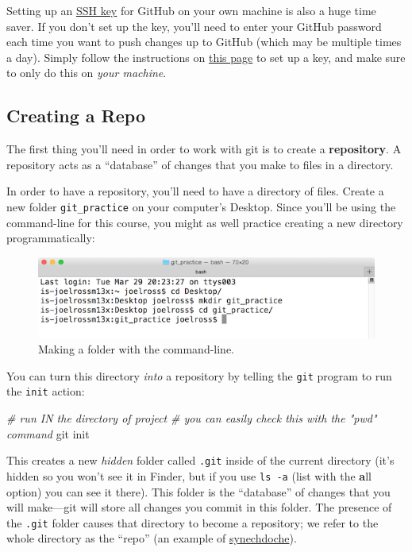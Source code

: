 \documentclass[]{book}
\newenvironment{Shaded}{\begin{snugshade}}{\end{snugshade}}
\newcommand{\CommentTok}[1]{\textcolor[rgb]{0.56,0.35,0.01}{\textit{#1}}}
\newcommand{\FunctionTok}[1]{\textcolor[rgb]{0.00,0.00,0.00}{#1}}
\newcommand{\NormalTok}[1]{#1}
\theoremstyle{definition}
\theoremstyle{definition}
\theoremstyle{remark}
\begin{document}
Setting up an
\href{https://help.github.com/articles/generating-a-new-ssh-key-and-adding-it-to-the-ssh-agent}{SSH
key} for GitHub on your own machine is also a huge time saver. If you
don't set up the key, you'll need to enter your GitHub password each
time you want to push changes up to GitHub (which may be multiple times
a day). Simply follow the instructions on
\href{https://help.github.com/articles/generating-a-new-ssh-key-and-adding-it-to-the-ssh-agent}{this
page} to set up a key, and make sure to only do this on \emph{your
machine}.

\subsection{Creating a Repo}\label{creating-a-repo}

The first thing you'll need in order to work with git is to create a
\textbf{repository}. A repository acts as a ``database'' of changes that
you make to files in a directory.

In order to have a repository, you'll need to have a directory of files.
Create a new folder \texttt{git\_practice} on your computer's Desktop.
Since you'll be using the command-line for this course, you might as
well practice creating a new directory programmatically:

\begin{figure}
\centering
\includegraphics{img/git-basics/git-mkdir.png}
\caption{Making a folder with the command-line.}
\end{figure}

You can turn this directory \emph{into} a repository by telling the
\texttt{git} program to run the \texttt{init} action:

\begin{Shaded}
\begin{Highlighting}[]
\CommentTok{# run IN the directory of project}
\CommentTok{# you can easily check this with the "pwd" command}
\FunctionTok{git}\NormalTok{ init}
\end{Highlighting}
\end{Shaded}

This creates a new \emph{hidden} folder called \texttt{.git} inside of
the current directory (it's hidden so you won't see it in Finder, but if
you use \texttt{ls\ -a} (list with the \textbf{a}ll option) you can see
it there). This folder is the ``database'' of changes that you will
make---git will store all changes you commit in this folder. The
presence of the \texttt{.git} folder causes that directory to become a
repository; we refer to the whole directory as the ``repo'' (an example
of \href{https://en.wikipedia.org/wiki/Synecdoche}{synechdoche}).
\end{document}
